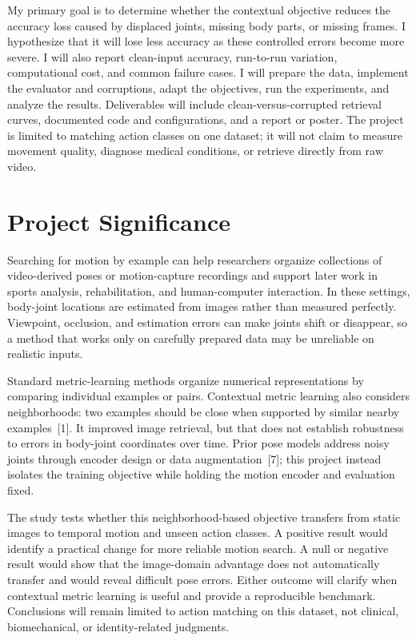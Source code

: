 \documentclass[10pt]{article}
\begin{document}
My primary goal is to determine whether the contextual objective reduces the accuracy loss caused by displaced joints, missing body parts, or missing frames. I hypothesize that it will lose less accuracy as these controlled errors become more severe. I will also report clean-input accuracy, run-to-run variation, computational cost, and common failure cases. I will prepare the data, implement the evaluator and corruptions, adapt the objectives, run the experiments, and analyze the results. Deliverables will include clean-versus-corrupted retrieval curves, documented code and configurations, and a report or poster. The project is limited to matching action classes on one dataset; it will not claim to measure movement quality, diagnose medical conditions, or retrieve directly from raw video.

\section*{Project Significance}

Searching for motion by example can help researchers organize collections of video-derived poses or motion-capture recordings and support later work in sports analysis, rehabilitation, and human-computer interaction. In these settings, body-joint locations are estimated from images rather than measured perfectly. Viewpoint, occlusion, and estimation errors can make joints shift or disappear, so a method that works only on carefully prepared data may be unreliable on realistic inputs.

Standard metric-learning methods organize numerical representations by comparing individual examples or pairs. Contextual metric learning also considers neighborhoods: two examples should be close when supported by similar nearby examples~[1]. It improved image retrieval, but that does not establish robustness to errors in body-joint coordinates over time. Prior pose models address noisy joints through encoder design or data augmentation~[7]; this project instead isolates the training objective while holding the motion encoder and evaluation fixed.

The study tests whether this neighborhood-based objective transfers from static images to temporal motion and unseen action classes. A positive result would identify a practical change for more reliable motion search. A null or negative result would show that the image-domain advantage does not automatically transfer and would reveal difficult pose errors. Either outcome will clarify when contextual metric learning is useful and provide a reproducible benchmark. Conclusions will remain limited to action matching on this dataset, not clinical, biomechanical, or identity-related judgments.
\end{document}
